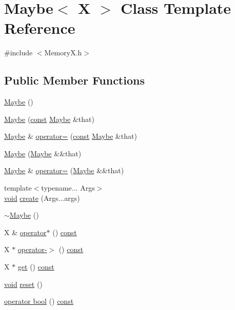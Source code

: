 \hypertarget{class_maybe}{}\section{Maybe$<$ X $>$ Class Template Reference}
\label{class_maybe}


{\ttfamily \#include $<$Memory\+X.\+h$>$}

\subsection*{Public Member Functions}
\begin{DoxyCompactItemize}
\item 
\hyperlink{class_maybe_a92ba99d58002ef6ffa982873804d4021}{Maybe} ()
\item 
\hyperlink{class_maybe_a64475d8959e7799953bf8f9500565968}{Maybe} (\hyperlink{getopt1_8c_a2c212835823e3c54a8ab6d95c652660e}{const} \hyperlink{class_maybe}{Maybe} \&that)
\item 
\hyperlink{class_maybe}{Maybe} \& \hyperlink{class_maybe_a55259bef1844d1ea79ad4fc7e6141c88}{operator=} (\hyperlink{getopt1_8c_a2c212835823e3c54a8ab6d95c652660e}{const} \hyperlink{class_maybe}{Maybe} \&that)
\item 
\hyperlink{class_maybe_aa40eda04511d95508a522f4276b0616c}{Maybe} (\hyperlink{class_maybe}{Maybe} \&\&that)
\item 
\hyperlink{class_maybe}{Maybe} \& \hyperlink{class_maybe_a46250c8132f651c0e1cc3074a28ad0b5}{operator=} (\hyperlink{class_maybe}{Maybe} \&\&that)
\item 
{\footnotesize template$<$typename... Args$>$ }\\\hyperlink{sound_8c_ae35f5844602719cf66324f4de2a658b3}{void} \hyperlink{class_maybe_ad1a6ede9fc786af6ce70547692489bac}{create} (Args...\+args)
\item 
\hyperlink{class_maybe_aabd6d8d529ac6eee233c9c02cc2bdeeb}{$\sim$\+Maybe} ()
\item 
X \& \hyperlink{class_maybe_a5cf5e09661beb115e0b183f1972d3a8d}{operator$\ast$} () \hyperlink{getopt1_8c_a2c212835823e3c54a8ab6d95c652660e}{const} 
\item 
X $\ast$ \hyperlink{class_maybe_a51e183371bc827e57c4dad2b11c24c12}{operator-\/$>$} () \hyperlink{getopt1_8c_a2c212835823e3c54a8ab6d95c652660e}{const} 
\item 
X $\ast$ \hyperlink{class_maybe_ac627a914748e769d94e59850bbdf9e95}{get} () \hyperlink{getopt1_8c_a2c212835823e3c54a8ab6d95c652660e}{const} 
\item 
\hyperlink{sound_8c_ae35f5844602719cf66324f4de2a658b3}{void} \hyperlink{class_maybe_aea6490ac74256652cee025081106f3f7}{reset} ()
\item 
\hyperlink{class_maybe_a2680b55ab81e690ba2a30f2e931dd7f9}{operator bool} () \hyperlink{getopt1_8c_a2c212835823e3c54a8ab6d95c652660e}{const} 
\end{DoxyCompactItemize}


